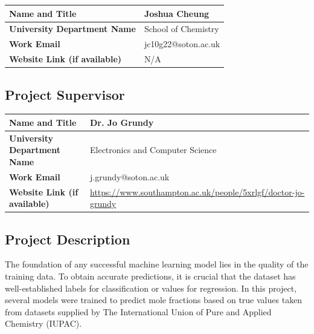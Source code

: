 \documentclass[11pt, titlepage]{article}
\begin{document}
\begin{table}[H]
    \centering
    \begin{tabular}{|p{2in}|p{4in}|}
        \hline
        \textbf{Name and Title} & Joshua Cheung \\
        \hline
        \textbf{University Department Name} & School of Chemistry \\
        \hline
        \textbf{Work Email} & jc10g22@soton.ac.uk \\
        \hline
        \textbf{Website Link (if available)} & N/A \\
        \hline      
    \end{tabular}
\end{table}

\subsection{Project Supervisor}

\begin{table}[H]
    \centering
    \begin{tabular}{|p{2in}|p{4in}|}
        \hline
        \textbf{Name and Title} & Dr. Jo Grundy \\
        \hline
        \textbf{University Department Name} & 
        Electronics and Computer Science \\
        \hline
        \textbf{Work Email} & 
        j.grundy@soton.ac.uk \\
        \hline
        \textbf{Website Link (if available)} & 
   \href{xxx}{https://www.southampton.ac.uk/people/5xrlgf/doctor-jo-grundy}\\
        \hline      
    \end{tabular}
\end{table}

\subsection{Project Description}
\label{section:challenge}
The foundation of any successful machine learning model lies in the quality of the training data. To obtain accurate predictions, it is crucial that the dataset has well-established labels for classification or values for regression. In this project, several models were trained to predict mole fractions based on true values taken from datasets supplied by The International Union of Pure and Applied Chemistry (IUPAC). \\
\end{document}
